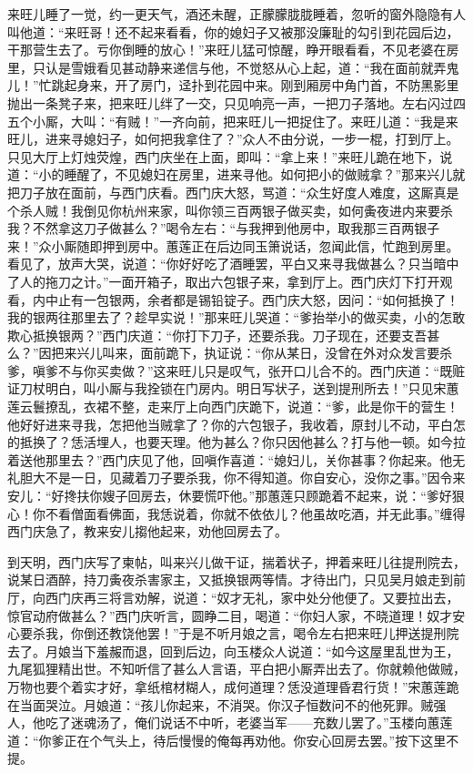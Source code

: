来旺儿睡了一觉，约一更天气，酒还未醒，正朦朦胧胧睡着，忽听的窗外隐隐有人叫他道：“来旺哥！还不起来看看，你的媳妇子又被那没廉耻的勾引到花园后边，干那营生去了。亏你倒睡的放心！”来旺儿猛可惊醒，睁开眼看看，不见老婆在房里，只认是雪娥看见甚动静来递信与他，不觉怒从心上起，道：“我在面前就弄鬼儿！”忙跳起身来，开了房门，迳扑到花园中来。刚到厢房中角门首，不防黑影里抛出一条凳子来，把来旺儿绊了一交，只见响亮一声，一把刀子落地。左右闪过四五个小厮，大叫：“有贼！”一齐向前，把来旺儿一把捉住了。来旺儿道：“我是来旺儿，进来寻媳妇子，如何把我拿住了？”众人不由分说，一步一棍，打到厅上。只见大厅上灯烛荧煌，西门庆坐在上面，即叫：“拿上来！”来旺儿跪在地下，说道：“小的睡醒了，不见媳妇在房里，进来寻他。如何把小的做贼拿？”那来兴儿就把刀子放在面前，与西门庆看。西门庆大怒，骂道：“众生好度人难度，这厮真是个杀人贼！我倒见你杭州来家，叫你领三百两银子做买卖，如何夤夜进内来要杀我？不然拿这刀子做甚么？”喝令左右：“与我押到他房中，取我那三百两银子来！”众小厮随即押到房中。蕙莲正在后边同玉箫说话，忽闻此信，忙跑到房里。看见了，放声大哭，说道：“你好好吃了酒睡罢，平白又来寻我做甚么？只当暗中了人的拖刀之计。”一面开箱子，取出六包银子来，拿到厅上。西门庆灯下打开观看，内中止有一包银两，余者都是锡铅锭子。西门庆大怒，因问：“如何抵换了！我的银两往那里去了？趁早实说！”那来旺儿哭道：“爹抬举小的做买卖，小的怎敢欺心抵换银两？”西门庆道：“你打下刀子，还要杀我。刀子现在，还要支吾甚么？”因把来兴儿叫来，面前跪下，执证说：“你从某日，没曾在外对众发言要杀爹，嗔爹不与你买卖做？”这来旺儿只是叹气，张开口儿合不的。西门庆道：“既赃证刀杖明白，叫小厮与我拴锁在门房内。明日写状子，送到提刑所去！”只见宋蕙莲云鬟撩乱，衣裙不整，走来厅上向西门庆跪下，说道：“爹，此是你干的营生！他好好进来寻我，怎把他当贼拿了？你的六包银子，我收着，原封儿不动，平白怎的抵换了？恁活埋人，也要天理。他为甚么？你只因他甚么？打与他一顿。如今拉着送他那里去？”西门庆见了他，回嗔作喜道：“媳妇儿，关你甚事？你起来。他无礼胆大不是一日，见藏着刀子要杀我，你不得知道。你自安心，没你之事。”因令来安儿：“好搀扶你嫂子回房去，休要慌吓他。”那蕙莲只顾跪着不起来，说：“爹好狠心！你不看僧面看佛面，我恁说着，你就不依依儿？他虽故吃酒，并无此事。”缠得西门庆急了，教来安儿搊他起来，劝他回房去了。

到天明，西门庆写了柬帖，叫来兴儿做干证，揣着状子，押着来旺儿往提刑院去，说某日酒醉，持刀夤夜杀害家主，又抵换银两等情。才待出门，只见吴月娘走到前厅，向西门庆再三将言劝解，说道：“奴才无礼，家中处分他便了。又要拉出去，惊官动府做甚么？”西门庆听言，圆睁二目，喝道：“你妇人家，不晓道理！奴才安心要杀我，你倒还教饶他罢！”于是不听月娘之言，喝令左右把来旺儿押送提刑院去了。月娘当下羞赧而退，回到后边，向玉楼众人说道：“如今这屋里乱世为王，九尾狐狸精出世。不知听信了甚么人言语，平白把小厮弄出去了。你就赖他做贼，万物也要个着实才好，拿纸棺材糊人，成何道理？恁没道理昏君行货！”宋蕙莲跪在当面哭泣。月娘道：“孩儿你起来，不消哭。你汉子恒数问不的他死罪。贼强人，他吃了迷魂汤了，俺们说话不中听，老婆当军——充数儿罢了。”玉楼向蕙莲道：“你爹正在个气头上，待后慢慢的俺每再劝他。你安心回房去罢。”按下这里不提。


